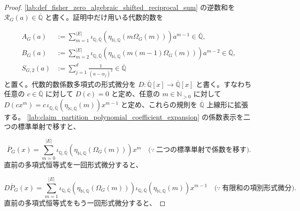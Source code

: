 \documentclass[11pt,a4paper]{article}
\theoremstyle{remark}
\begin{document}
\begin{proof}
\cref{lab:def_fisher_zero_algebraic_shifted_reciprocal_sum}
 の逆数和を
$\mathcal R_G(a)\in\overline{\mathbb Q}$
 と書く。証明中だけ用いる代数的数を

\[\begin{aligned}
A_G(a)
&:=
\sum_{m=1}^{|E|}
\iota_{\mathbb Q,\overline{\mathbb Q}}\!\left(
  \eta_{\mathbb N,\mathbb Q}\!\left(m\Omega_G(m)\right)
\right)
a^{m-1}
\in\overline{\mathbb Q},\\
B_G(a)
&:=
\sum_{m=2}^{|E|}
\iota_{\mathbb Q,\overline{\mathbb Q}}\!\left(
  \eta_{\mathbb N,\mathbb Q}\!\left(m(m-1)\Omega_G(m)\right)
\right)
a^{m-2}
\in\overline{\mathbb Q},\\
S_{G,2}(a)
&:=
\sum_{j=1}^{d}\frac{1}{(a-\alpha_j)^2}
\in\overline{\mathbb Q}
\end{aligned}\]
と置く。代数的数係数多項式の形式微分を
$D:\overline{\mathbb Q}[x]\to\overline{\mathbb Q}[x]$
 と書く。すなわち任意の
$c\in\overline{\mathbb Q}$
 に対して
$D(c)=0$
 と定め、任意の
$m\in\mathbb N_{>0}$
 に対して
$D(cx^m)=c\,\iota_{\mathbb Q,\overline{\mathbb Q}}\!\left(\eta_{\mathbb N,\mathbb Q}(m)\right)x^{m-1}$
 と定め、これらの規則を
$\overline{\mathbb Q}$
 上線形に拡張する。
\cref{lab:claim_partition_polynomial_coefficient_expansion}
 の係数表示を二つの標準単射で移すと、

\[\overline P_G(x)
=
\sum_{m=0}^{|E|}
\iota_{\mathbb Q,\overline{\mathbb Q}}\!\left(
  \eta_{\mathbb N,\mathbb Q}\!\left(\Omega_G(m)\right)
\right)
x^m
\quad\bigl(\because\ \text{二つの標準単射で係数を移す}\bigr).\]
直前の多項式恒等式を一回形式微分すると、

\[D\overline P_G(x)
=
\sum_{m=1}^{|E|}
\iota_{\mathbb Q,\overline{\mathbb Q}}\!\left(
  \eta_{\mathbb N,\mathbb Q}\!\left(\Omega_G(m)\right)
\right)
\iota_{\mathbb Q,\overline{\mathbb Q}}\!\left(
  \eta_{\mathbb N,\mathbb Q}(m)
\right)
x^{m-1}
\quad\bigl(\because\ \text{有限和の項別形式微分}\bigr).\]
直前の多項式恒等式をもう一回形式微分すると、


\end{proof}
\end{document}
